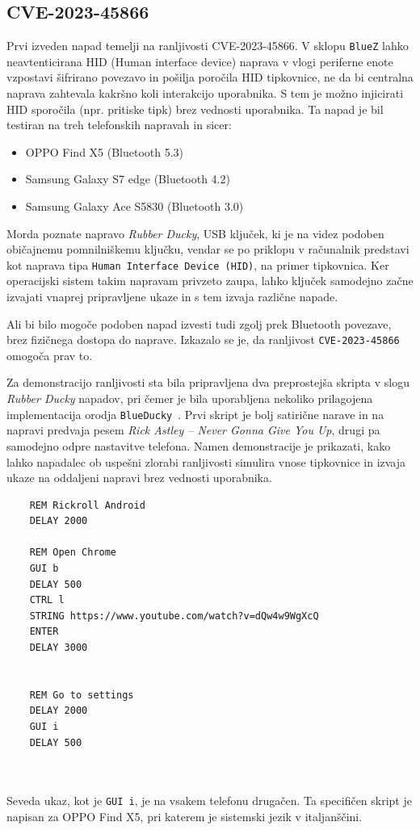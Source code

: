 \documentclass[11pt,a4paper,slovene]{article}
\begin{document}
\subsection{CVE-2023-45866}

Prvi izveden napad temelji na ranljivosti CVE-2023-45866. V sklopu \texttt{BlueZ} lahko neavtenticirana HID (Human interface device) naprava v vlogi periferne enote vzpostavi šifrirano povezavo in pošilja poročila HID tipkovnice, ne da bi centralna naprava zahtevala kakršno koli interakcijo uporabnika. S tem je možno injicirati HID sporočila (npr. pritiske tipk) brez vednosti uporabnika.
Ta napad je bil testiran na treh telefonskih napravah in sicer: 
\begin{itemize}
	\item OPPO Find X5 (Bluetooth 5.3)
	\item Samsung Galaxy S7 edge (Bluetooth 4.2)
	\item Samsung Galaxy Ace S5830 (Bluetooth 3.0)
\end{itemize}

Morda poznate napravo \textit{Rubber Ducky}, USB ključek, ki je na videz podoben običajnemu pomnilniškemu ključku, vendar se po priklopu v računalnik predstavi kot naprava tipa \texttt{Human Interface Device (HID)}, na primer tipkovnica. Ker operacijski sistem takim napravam privzeto zaupa, lahko ključek samodejno začne izvajati vnaprej pripravljene ukaze in s tem izvaja različne napade.

Ali bi bilo mogoče podoben napad izvesti tudi zgolj prek Bluetooth povezave, brez fizičnega dostopa do naprave. Izkazalo se je, da ranljivost \texttt{CVE-2023-45866} omogoča prav to.

Za demonstracijo ranljivosti sta bila pripravljena dva preprostejša skripta v slogu \textit{Rubber Ducky} napadov, pri čemer je bila uporabljena nekoliko prilagojena implementacija orodja \texttt{BlueDucky}~\cite{blueducky, cve2023-45866}. Prvi skript je bolj satirične narave in na napravi predvaja pesem \textit{Rick Astley -- Never Gonna Give You Up}, drugi pa samodejno odpre nastavitve telefona. Namen demonstracije je prikazati, kako lahko napadalec ob uspešni zlorabi ranljivosti simulira vnose tipkovnice in izvaja ukaze na oddaljeni napravi brez vednosti uporabnika.

\begin{verbatim}
	REM Rickroll Android
	DELAY 2000
	
	REM Open Chrome
	GUI b
	DELAY 500
	CTRL l
	STRING https://www.youtube.com/watch?v=dQw4w9WgXcQ
	ENTER
	DELAY 3000

	
	REM Go to settings
	DELAY 2000
	GUI i
	DELAY 500
	
	
\end{verbatim}
Seveda ukaz, kot je \texttt{GUI i}, je na vsakem telefonu drugačen. Ta specifičen skript je napisan za OPPO Find X5, pri katerem je sistemski jezik v italjanščini.
\end{document}
